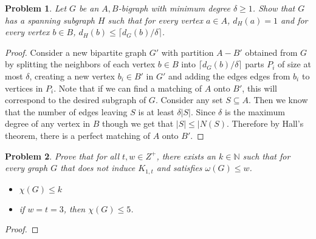 \documentclass[12pt]{article}
\newtheorem{problem}{Problem}
\begin{document}
\begin{problem} Let $G$ be an $A,B$-bigraph with minimum degree
  $\delta \geq 1$. Show that $G$ has a spanning subgraph $H$ such that
  for every vertex $a \in A$, $d_H(a) = 1$ and for every vertex
  $b \in B$, $d_H(b) \leq \lceil d_G(b) / \delta \rceil$.
\end{problem}
\begin{proof} Consider a new bipartite graph $G'$ with partition
  $A-B'$ obtained from $G$ by splitting the neighbors of each vertex
  $b \in B$ into $\lceil d_G(b) / \delta \rceil$ parts $P_i$ of size
  at most $\delta$, creating a new vertex $b_i \in B'$ in $G'$ and
  adding the edges edges from $b_i$ to vertices in $P_i$.  Note that
  if we can find a matching of $A$ onto $B'$, this will correspond to
  the desired subgraph of $G$. Consider any set $S \subseteq A$. Then
  we know that the number of edges leaving $S$ is at least
  $\delta |S|$. Since $\delta$ is the maximum degree of any vertex in
  $B$ though we get that $|S| \leq |N(S)$. Therefore by Hall's
  theorem, there is a perfect matching of $A$ onto $B'$.
\end{proof}

\begin{problem} Prove that for all $t,w \in Z^+$, there exists an
  $k \in \mathbb{N}$ such that for every graph $G$ that does not
  induce $K_{1,t}$ and satisfies $\omega(G) \leq w$.
  \begin{itemize}
  \item[(a)] $\chi(G) \leq k$
  \item[(b)] if $w = t = 3$, then $\chi(G) \leq 5$.
  \end{itemize}
\end{problem}
\begin{proof}
\end{proof}
\end{document}
